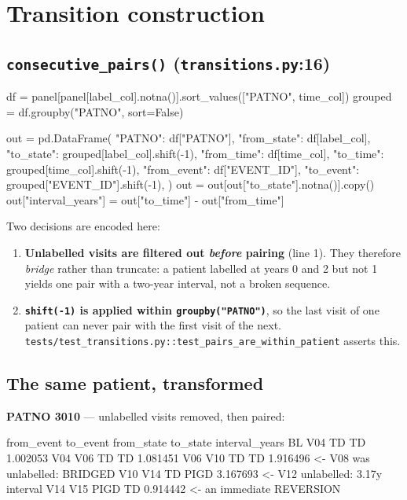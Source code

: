 \documentclass[11pt,a4paper]{article}
\newcommand{\code}[1]{\texttt{\small #1}}
\begin{document}
\section{Transition construction}

\subsection{\code{consecutive\_pairs()} \quad (\code{transitions.py}:16)}

\begin{codeblock}
df = panel[panel[label_col].notna()].sort_values(["PATNO", time_col])
grouped = df.groupby("PATNO", sort=False)

out = pd.DataFrame({
    "PATNO":      df["PATNO"],
    "from_state": df[label_col],
    "to_state":   grouped[label_col].shift(-1),
    "from_time":  df[time_col],
    "to_time":    grouped[time_col].shift(-1),
    "from_event": df["EVENT_ID"],
    "to_event":   grouped["EVENT_ID"].shift(-1),
})
out = out[out["to_state"].notna()].copy()
out["interval_years"] = out["to_time"] - out["from_time"]
\end{codeblock}

Two decisions are encoded here:

\begin{enumerate}
  \item \textbf{Unlabelled visits are filtered out \emph{before} pairing}
        (line 1). They therefore \emph{bridge} rather than truncate: a patient
        labelled at years 0 and 2 but not 1 yields one pair with a two-year
        interval, not a broken sequence.
  \item \textbf{\code{shift(-1)} is applied within \code{groupby("PATNO")}},
        so the last visit of one patient can never pair with the first visit of
        the next. \code{tests/test\_transitions.py::test\_pairs\_are\_within\_patient}
        asserts this.
\end{enumerate}

\subsection{The same patient, transformed}

\textbf{PATNO 3010} --- unlabelled visits removed, then paired:

\begin{codeblock}
from_event to_event  from_state  to_state  interval_years
        BL      V04          TD        TD        1.002053
       V04      V06          TD        TD        1.081451
       V06      V10          TD        TD        1.916496   <- V08 was unlabelled: BRIDGED
       V10      V14          TD      PIGD        3.167693   <- V12 unlabelled: 3.17y interval
       V14      V15        PIGD        TD        0.914442   <- an immediate REVERSION
\end{codeblock}
\end{document}
